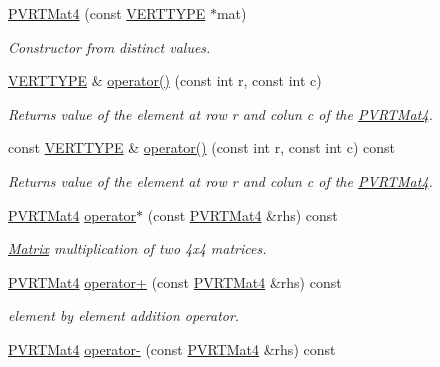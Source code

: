 \begin{DoxyCompactItemize}
\hyperlink{struct_p_v_r_t_mat4_ab0df9dd84c7df9b9483ad20ec80ff049}{P\+V\+R\+T\+Mat4} (const \hyperlink{group___a_p_i___o_g_l_e_s_ga06da457b7d3e93368ab904f89e1396be}{V\+E\+R\+T\+T\+Y\+P\+E} $\ast$mat)
\begin{DoxyCompactList}\small\item\em Constructor from distinct values. \end{DoxyCompactList}\item 
\hyperlink{group___a_p_i___o_g_l_e_s_ga06da457b7d3e93368ab904f89e1396be}{V\+E\+R\+T\+T\+Y\+P\+E} \& \hyperlink{struct_p_v_r_t_mat4_a85e8c31582bb6218b46813d65fbe0a89}{operator()} (const int r, const int c)
\begin{DoxyCompactList}\small\item\em Returns value of the element at row r and colun c of the \hyperlink{struct_p_v_r_t_mat4}{P\+V\+R\+T\+Mat4}. \end{DoxyCompactList}\item 
const \hyperlink{group___a_p_i___o_g_l_e_s_ga06da457b7d3e93368ab904f89e1396be}{V\+E\+R\+T\+T\+Y\+P\+E} \& \hyperlink{struct_p_v_r_t_mat4_a6beb0df4c99aad7bd4b68caabf192ece}{operator()} (const int r, const int c) const 
\begin{DoxyCompactList}\small\item\em Returns value of the element at row r and colun c of the \hyperlink{struct_p_v_r_t_mat4}{P\+V\+R\+T\+Mat4}. \end{DoxyCompactList}\item 
\hyperlink{struct_p_v_r_t_mat4}{P\+V\+R\+T\+Mat4} \hyperlink{struct_p_v_r_t_mat4_a4bba6e8590029eb8e378992cb2661f2a}{operator$\ast$} (const \hyperlink{struct_p_v_r_t_mat4}{P\+V\+R\+T\+Mat4} \&rhs) const 
\begin{DoxyCompactList}\small\item\em \hyperlink{class_matrix}{Matrix} multiplication of two 4x4 matrices. \end{DoxyCompactList}\item 
\hyperlink{struct_p_v_r_t_mat4}{P\+V\+R\+T\+Mat4} \hyperlink{struct_p_v_r_t_mat4_a8b0f3e1ca092dcb5e8bf5aa5c4741531}{operator+} (const \hyperlink{struct_p_v_r_t_mat4}{P\+V\+R\+T\+Mat4} \&rhs) const 
\begin{DoxyCompactList}\small\item\em element by element addition operator. \end{DoxyCompactList}\item 
\hyperlink{struct_p_v_r_t_mat4}{P\+V\+R\+T\+Mat4} \hyperlink{struct_p_v_r_t_mat4_ae79c2bf5aa777d30839d962f0bf23be2}{operator-\/} (const \hyperlink{struct_p_v_r_t_mat4}{P\+V\+R\+T\+Mat4} \&rhs) const 

\end{DoxyCompactItemize}
